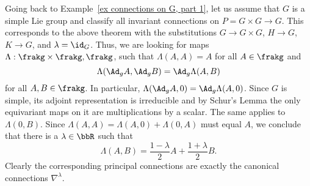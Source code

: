 \begin{example}\label{ex connections on G, part 6}
    Going back to Example~\ref{ex connections on G, part 1}, 
    let us assume that $G$ is a simple Lie group and classify all invariant connections on $P=G\times G\to G$. This corresponds to the above theorem with the substitutions $G\to G\times G$, $H\to G$, $K\to G$, and $\lambda=\id_G$. Thus, we are looking for maps  $\Lambda:\frakg\times\frakg,\frakg$, such that $\Lambda(A,A)=A$ for all $A\in\frakg$ and 
    \[\Lambda(\Ad_{g} A,\Ad_{g}B)=\Ad_g\Lambda(A,B)\]
    for all $A,B\in\frakg$. In particular, $\Lambda(\Ad_g A,0)=\Ad_g \Lambda(A,0)$. Since $G$ is simple, its adjoint representation is irreducible and by Schur's Lemma the only equivariant maps on it are multiplications by a scalar. The same applies to $\Lambda(0,B)$. Since $\Lambda(A,A)=\Lambda(A,0)+\Lambda(0,A)$ must equal $A$, we conclude that there is a $\lambda\in\bbR$ such that 
    \[\Lambda(A,B)=\frac{1-\lambda}{2}A+\frac{1+\lambda}{2}B.\]
    Clearly the corresponding principal connections are exactly the canonical connections $\nabla^\lambda$.

\end{example}



